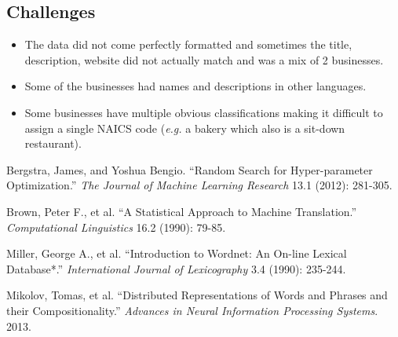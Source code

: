 \documentclass[letterpaper, 9 pt, conference]{IEEEtran}
\begin{document}
\subsection{Challenges}
\begin{itemize}

\item The data did not come perfectly formatted and sometimes the title, description, website did not actually match and was a mix of 2 businesses.
\item Some of the businesses had names and descriptions in other languages.
\item Some businesses have multiple obvious classifications making it difficult to assign a single NAICS code (\textit{e.g.} a bakery which also is a sit-down restaurant).

\end{itemize}

\begin{thebibliography}{99}

 Bergstra, James, and Yoshua Bengio. ``Random Search for Hyper-parameter Optimization.'' \textit{The Journal of Machine Learning Research} 13.1 (2012): 281-305.

 Brown, Peter F., et al. ``A Statistical Approach to Machine Translation.'' \textit{Computational Linguistics} 16.2 (1990): 79-85.

 Miller, George A., et al. ``Introduction to Wordnet: An On-line Lexical Database*.'' \textit{International Journal of Lexicography} 3.4 (1990): 235-244.

 Mikolov, Tomas, et al. ``Distributed Representations of Words and Phrases and their Compositionality.'' \textit{Advances in Neural Information Processing Systems}. 2013.

\end{thebibliography}

\addtolength{\textheight}{-12cm}   %

\ifx
\newpage
\end{document}
